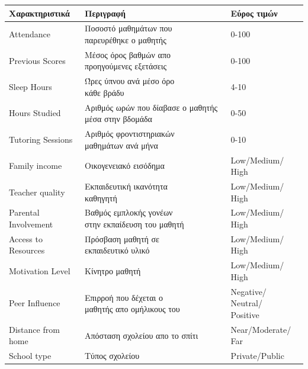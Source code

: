 \documentclass[12pt]{article}
\begin{document}
\begin{center}
\begin{longtable}{|p{5cm}|p{7.1cm}|p{4cm}|} %
\hline
Χαρακτηριστικά & Περιγραφή & Εύρος τιμών \\ %
\hline
Attendance & \makecell[l]{Ποσοστό μαθημάτων που\\ παρευρέθηκε ο μαθητής} & 0-100 \\ %
\hline
Previous Scores & \makecell[l]{Μέσος όρος βαθμών απο\\ προηγούμενες εξετάσεις} & 0-100 \\ %
\hline
Sleep Hours & \makecell[l]{Ώρες ύπνου ανά μέσο όρο\\ κάθε βράδυ} & 4-10 \\ %
\hline
Hours Studied & Αριθμός ωρών που δίαβασε ο μαθητής μέσα στην βδομάδα & 0-50 \\ %
\hline
Tutoring Sessions &\makecell[l]{Αριθμός φροντιστηριακών\\ μαθημάτων ανά μήνα} & 0-10 \\ %
\hline
Family income & Οικογενειακό εισόδημα & Low/Medium/ High \\ %
\hline
Teacher quality & \makecell[l]{Εκπαιδευτική ικανότητα\\ καθηγητή} & Low/Medium/ High \\ %
\hline
\makecell[l]{Parental\\ Involvement} & \makecell[l]{Βαθμός εμπλοκής γονέων\\ στην εκπαίδευση του μαθητή} & Low/Medium/ High \\ %
\hline
Access to Resources & \makecell[l]{Πρόσβαση μαθητή σε\\ εκπαιδευτικό υλικό} & Low/Medium/ High \\ %
\hline
Motivation Level & Κίνητρο μαθητή & Low/Medium/ High \\ %
\hline
Peer Influence & \makecell[l]{Επιρροή που δέχεται ο\\ μαθητής απο ομήλικους του} & \makecell[l]{Negative/\\ Neutral/ \\Positive} \\ %
\hline
Distance from home & Απόσταση σχολείου απο το σπίτι & Near/Moderate/ Far \\ %
\hline
School type & Τύπος σχολείου & Private/Public \\ %
\hline


\end{longtable}
\end{center}
\end{document}
